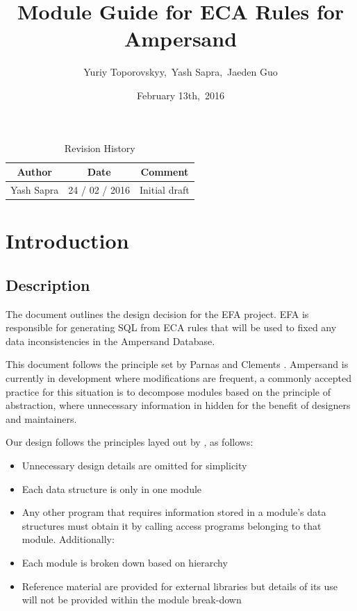 \documentclass[12pt]{article}
\begin{document}
\title{\vspace*{3cm} Module Guide for ECA Rules for Ampersand} 
\author{Yuriy Toporovskyy,\ Yash Sapra,\ Jaeden Guo}
\date{February 13th,\ 2016} 

	
\maketitle
\vspace*{1cm}
\begin{table}[ht!]\begin{center}
        \caption{Revision History}  
        \begin{tabular}{|c|c|c|}\hline
            \textbf{Author} & \textbf{Date} & \textbf{Comment} \\\hline 
            Yash Sapra & 24 / 02 / 2016 & Initial draft\\\hline
        \end{tabular}
    \end{center}\end{table}
\newpage

\tableofcontents

\newpage

\section{Introduction}
\subsection{Description}
The document outlines the design decision for the EFA project. 
EFA is responsible for generating SQL from ECA rules that will 
be used to fixed any data inconsistencies in the Ampersand Database.

This document follows the principle set by Parnas and Clements \citep{fakeIt} . 
Ampersand is currently in development where modifications are frequent, a 
commonly accepted practice for this situation is to decompose modules based on 
the principle of abstraction, where unnecessary information in hidden for the 
benefit of designers and maintainers\citep{modStruct,Parnas1972}.
 
Our design follows the principles layed out by \citep{modStruct}, as follows:
\begin{itemize}
\item Unnecessary design details are omitted for simplicity
\item Each data structure is only in one module
\item Any other program that requires information stored in a module's data
  structures must obtain it by calling access programs belonging to that module.
Additionally: 
\item Each module is broken down based on hierarchy
\item Reference material are provided for external libraries but details of its 
use will not be provided within the module break-down
\end{itemize}
\end{document}
